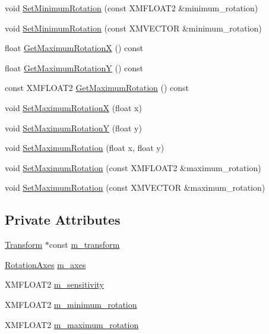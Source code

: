 \begin{DoxyCompactItemize}
\item 
void \hyperlink{classmage_1_1_mouse_look_script_acdc7b208d0636684a7a68bf5bb7ad7a2}{Set\+Minimum\+Rotation} (const X\+M\+F\+L\+O\+A\+T2 \&minimum\+\_\+rotation)
\item 
void \hyperlink{classmage_1_1_mouse_look_script_a2cc85b735807f6d3898efa89c5e689c3}{Set\+Minimum\+Rotation} (const X\+M\+V\+E\+C\+T\+OR \&minimum\+\_\+rotation)
\item 
float \hyperlink{classmage_1_1_mouse_look_script_a07b026b6cb84edfacba8c05dc550da80}{Get\+Maximum\+RotationX} () const
\item 
float \hyperlink{classmage_1_1_mouse_look_script_a9d7ac7941846f4c47d65718faabf6dad}{Get\+Maximum\+RotationY} () const
\item 
const X\+M\+F\+L\+O\+A\+T2 \hyperlink{classmage_1_1_mouse_look_script_a644a7b52eccd338aaa141e8a1016c4e2}{Get\+Maximum\+Rotation} () const
\item 
void \hyperlink{classmage_1_1_mouse_look_script_a080934c7e393603beda98ae0096e3ab7}{Set\+Maximum\+RotationX} (float x)
\item 
void \hyperlink{classmage_1_1_mouse_look_script_ab99d73d8ec44b4e484dffc63bf3f39b1}{Set\+Maximum\+RotationY} (float y)
\item 
void \hyperlink{classmage_1_1_mouse_look_script_a2e9d5982a1d650af143b06ed1d8ccde2}{Set\+Maximum\+Rotation} (float x, float y)
\item 
void \hyperlink{classmage_1_1_mouse_look_script_a551e76e245258b879f229e4e86a91650}{Set\+Maximum\+Rotation} (const X\+M\+F\+L\+O\+A\+T2 \&maximum\+\_\+rotation)
\item 
void \hyperlink{classmage_1_1_mouse_look_script_a1ada4478723b4270dfcb644f4c1b8dc7}{Set\+Maximum\+Rotation} (const X\+M\+V\+E\+C\+T\+OR \&maximum\+\_\+rotation)
\end{DoxyCompactItemize}
\subsection*{Private Attributes}
\begin{DoxyCompactItemize}
\item 
\hyperlink{structmage_1_1_transform}{Transform} $\ast$const \hyperlink{classmage_1_1_mouse_look_script_ade6a6a3d786d64b67594d8ed38757e24}{m\+\_\+transform}
\item 
\hyperlink{namespacemage_a548e5c31b08a1078841ed21948f5bf4c}{Rotation\+Axes} \hyperlink{classmage_1_1_mouse_look_script_ab5df1b96d5860a9b8f30256e7c89b26b}{m\+\_\+axes}
\item 
X\+M\+F\+L\+O\+A\+T2 \hyperlink{classmage_1_1_mouse_look_script_a4f38b9bd8e7271503a70753ce6a923c7}{m\+\_\+sensitivity}
\item 
X\+M\+F\+L\+O\+A\+T2 \hyperlink{classmage_1_1_mouse_look_script_ad09bda241666f60dfc408500cafd073d}{m\+\_\+minimum\+\_\+rotation}
\item 
X\+M\+F\+L\+O\+A\+T2 \hyperlink{classmage_1_1_mouse_look_script_a0d5f2933555b76efd7cf83c7672574dd}{m\+\_\+maximum\+\_\+rotation}
\end{DoxyCompactItemize}
